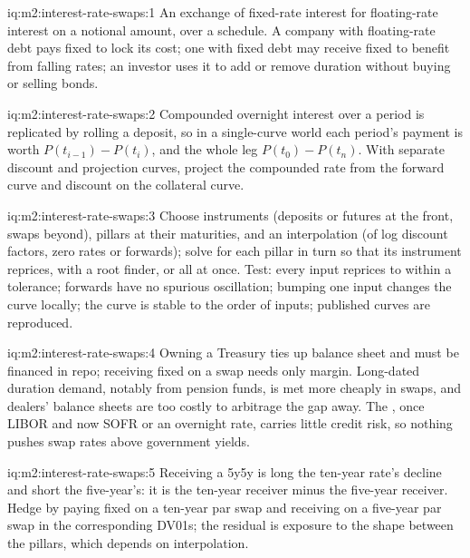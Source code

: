 \begin{solution}{iq:m2:interest-rate-swaps:1}
An exchange of fixed-rate interest for floating-rate interest on a notional
amount, over a schedule. A company with floating-rate debt pays fixed to lock
its cost; one with fixed debt may receive fixed to benefit from falling rates;
an investor uses it to add or remove duration without buying or selling bonds.
\end{solution}

\begin{solution}{iq:m2:interest-rate-swaps:2}
Compounded overnight interest over a period is replicated by rolling a deposit,
so in a single-curve world each period's payment is worth $P(t_{i-1}) -
P(t_i)$, and the whole leg $P(t_0) - P(t_n)$. With separate discount and
projection curves, project the compounded rate from the forward curve and
discount on the collateral curve.
\end{solution}

\begin{solution}{iq:m2:interest-rate-swaps:3}
Choose instruments (deposits or futures at the front, swaps beyond), pillars
at their maturities, and an interpolation (of log discount factors, zero rates
or forwards); solve for each pillar in turn so that its instrument reprices,
with a root finder, or all at once. Test: every input reprices to within a
tolerance; forwards have no spurious oscillation; bumping one input changes
the curve locally; the curve is stable to the order of inputs; published
curves are reproduced.
\end{solution}

\begin{solution}{iq:m2:interest-rate-swaps:4}
Owning a Treasury ties up balance sheet and must be financed in repo; receiving
fixed on a swap needs only margin. Long-dated duration demand, notably from
pension funds, is met more cheaply in swaps, and dealers' balance sheets are
too costly to arbitrage the gap away. The , once LIBOR and now SOFR
or an overnight rate, carries little credit risk, so nothing pushes swap rates
above government yields.
\end{solution}

\begin{solution}{iq:m2:interest-rate-swaps:5}
Receiving a 5y5y is long the ten-year rate's decline and short the five-year's:
it is the ten-year receiver minus the five-year receiver. Hedge by paying fixed
on a ten-year par swap and receiving on a five-year par swap in the
corresponding DV01s; the residual is exposure to the shape between the
pillars, which depends on interpolation.
\end{solution}

